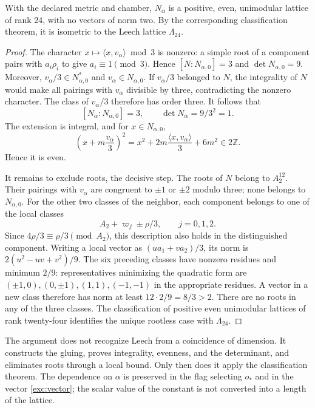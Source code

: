 \begin{theorem}
\label{exc:teorema-leech}
With the declared metric and chamber, $N_\alpha$ is a positive, even,
unimodular lattice of rank $24$, with no vectors of norm two.
By the corresponding classification theorem, it is isometric to the
Leech lattice $\Lambda_{24}$.
\end{theorem}

\begin{proof}
The character $x\mapsto\langle x,v_\alpha\rangle\bmod3$ is nonzero:
a simple root of a component pairs with $a_i\rho_i$ to give
$a_i\equiv1\pmod3$. Hence $[N:N_{\alpha,0}]=3$ and
$\det N_{\alpha,0}=9$. Moreover,
$v_\alpha/3\in N_{\alpha,0}^*$ and $v_\alpha\in N_{\alpha,0}$.
If $v_\alpha/3$ belonged to $N$, the integrality of $N$ would make
all pairings with $v_\alpha$ divisible by three,
contradicting the nonzero character. The class of $v_\alpha/3$ therefore
has order three. It follows that
\[
 [N_\alpha:N_{\alpha,0}]=3,
 \qquad \det N_\alpha=9/3^2=1.
\]
The extension is integral, and for $x\in N_{\alpha,0}$,
\[
 \left(x+m\frac{v_\alpha}{3}\right)^2
   =x^2+2m\frac{\langle x,v_\alpha\rangle}{3}+6m^2
   \in2\mathbb Z.
\]
Hence it is even.

It remains to exclude roots, the decisive step. The roots of $N$
belong to $A_2^{12}$. Their pairings with $v_\alpha$ are
congruent to $\pm1$ or $\pm2$ modulo three; none belongs to
$N_{\alpha,0}$. For the other two classes of the neighbor, each component
belongs to one of the local classes
\[
 A_2+\varpi_j\pm\rho/3,\qquad j=0,1,2.
\]
Since $4\rho/3\equiv\rho/3\pmod{A_2}$, this description also holds
in the distinguished component. Writing a local vector
as $(u a_1+v a_2)/3$, its norm is
$2(u^2-uv+v^2)/9$. The six preceding classes have nonzero residues
and minimum $2/9$: representatives minimizing the quadratic form
are $(\pm1,0),(0,\pm1),(1,1),(-1,-1)$ in the appropriate residues.
A vector in a new class therefore has norm at least
$12\cdot2/9=8/3>2$. There are no roots in any of the three classes.
The classification of positive even unimodular lattices of
rank twenty-four identifies the unique rootless case with
$\Lambda_{24}$.
\end{proof}

The argument does not recognize Leech from a coincidence of dimension.
It constructs the gluing, proves integrality, evenness, and the determinant, and
eliminates roots through a local bound. Only then does it apply the
classification theorem. The dependence on $\alpha$ is preserved in
the flag selecting $o_*$ and in the vector \eqref{exc:vector};
the scalar value of the constant is not converted into a length of the
lattice.

